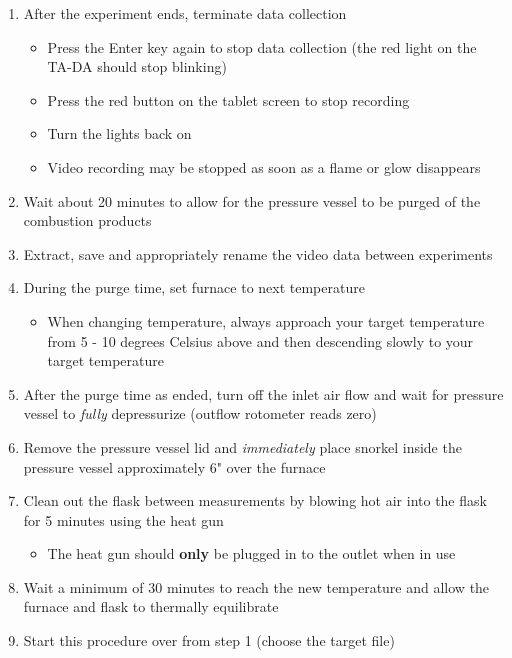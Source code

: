 \documentclass[letterpaper,11pt]{article}
\begin{document}
\begin{enumerate}
    \item After the experiment ends, terminate data collection
        \begin{itemize}
        \item Press the Enter key  again to stop data 
            collection (the red light on the TA-DA should stop blinking)
        \item Press the red button on the tablet screen to stop recording
        \item Turn the lights back on
        \item Video recording may be stopped as soon as a flame or glow
            disappears
        \end{itemize}
 
    \item Wait about 20 minutes to allow for the pressure 
        vessel to be purged of the combustion products
    \item Extract, save and appropriately rename the video data between 
            experiments
    \item During the purge time, set furnace to next temperature
        \begin{itemize}
            \item When changing temperature, always approach your target
                temperature from 5 - 10 degrees Celsius above and then 
                descending slowly to your target temperature
        \end{itemize}	
	\item After the purge time as ended, turn off the inlet air flow and wait 
        for pressure vessel to \textit{fully} depressurize (outflow rotometer reads zero)
	\item Remove the pressure vessel lid and \textit{immediately} place snorkel 
        inside the pressure vessel approximately 6" over the furnace  
    \item Clean out the flask between measurements by blowing hot air into
            the flask for 5 minutes using the heat gun
            \begin{itemize}
            \item The heat gun should \textbf{only} be plugged in to the outlet 
                when in use
            \end{itemize}
            
        \item Wait a minimum of 30 minutes to reach the new temperature and 
            allow the furnace and flask to thermally equilibrate
    \item Start this procedure over from step 1 (choose the target file)
    \end{enumerate}
	
\end{document}
